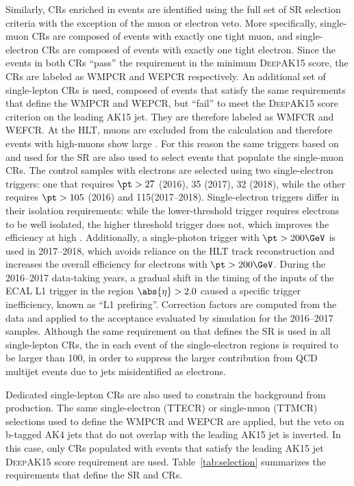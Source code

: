 Similarly, CRs enriched in \Wjets events are identified using the full set of SR selection criteria with the exception of the muon or electron veto. More specifically, single-muon CRs are composed of events with exactly one tight muon, and single-electron CRs are composed of events with exactly one tight electron. Since the events in both CRs ``pass'' the requirement in the minimum \textsc{DeepAK15} score, the CRs are labeled as WMPCR and WEPCR respectively. An additional set of single-lepton CRs is used, composed of events that satisfy the same requirements that define the WMPCR and WEPCR, but ``fail'' to meet the \textsc{DeepAK15} score criterion on the leading AK15 jet. They are therefore labeled as WMFCR and WEFCR\@. At the HLT, muons are excluded from the \ptmiss calculation and therefore events with high-\pt muons show large \ptmiss. For this reason the same triggers based on \ptmiss and \mht used for the SR are also used to select events that populate the single-muon CRs. The control samples with electrons are selected using two single-electron triggers: one that requires $\pt>27$ (2016), 35 (2017), 32 (2018)\GeV, while the other requires $\pt>105$ (2016) and 115\GeV (2017--2018). Single-electron triggers differ in their isolation requirements: while the lower-threshold trigger requires electrons to be well isolated, the higher threshold trigger does not, which improves the efficiency at high \pt. Additionally, a single-photon trigger with $\pt>200\GeV$ is used in 2017--2018, which avoids reliance on the HLT track reconstruction and increases the overall efficiency for electrons with $\pt > 200\GeV$. During the 2016--2017 data-taking years, a gradual shift in the timing of the inputs of the ECAL L1 trigger in the region $\abs{\eta} > 2.0$ caused a specific trigger inefficiency, known as ``L1 prefiring''. Correction factors are computed from the data and applied to the acceptance evaluated by simulation for the 2016--2017 samples. Although the same requirement on \recoil that defines the SR is used in all single-lepton CRs, the \ptmiss in each event of the single-electron regions is required to be larger than 100\GeV, in order to suppress the larger contribution from QCD multijet events due to jets misidentified as electrons. 

Dedicated single-lepton CRs are also used to constrain the background from \ttbar production. The same single-electron (TTECR) or single-muon (TTMCR) selections used to define the WMPCR and WEPCR are applied, but the veto on b-tagged AK4 jets that do not overlap with the leading AK15 jet is inverted. In this case, only CRs populated with events that satisfy the leading AK15 jet \textsc{DeepAK15} score requirement are used. Table~\ref{tab:selection} summarizes the requirements that define the SR and CRs.

